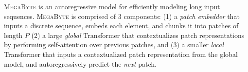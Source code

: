 \documentclass{article}
\newcommand{\fastslow}[0]{\textsc{MegaByte}\xspace}
\newcommand{\megabyte}[0]{\fastslow}
\newcommand{\h}[1]{h^\text{#1}}%
\newcommand{\inR}[1]{\in\mathbb{R}^{#1}}
\theoremstyle{plain}
\theoremstyle{definition}
\theoremstyle{remark}
\begin{document}



\megabyte is an autoregressive model for efficiently modeling long input sequences. \megabyte is comprised of 3 components: (1) a \emph{patch embedder} that inputs a discrete sequence, embeds each element, and chunks it into patches of length $P$ (2) a large \emph{global} Transformer that contextualizes patch representations by performing self-attention over previous patches, and (3) a smaller \emph{local} Transformer that inputs a contextualized patch representation from the global model, and autoregressively predict the \emph{next} patch.




\end{document}
